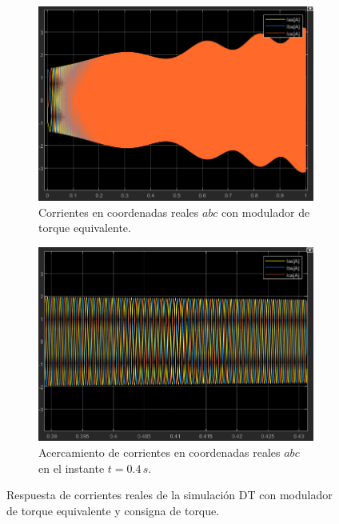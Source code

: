 \documentclass{article}
\begin{document}
\begin{figure}[H]
    \centering
    \begin{subfigure}[t]{0.48\textwidth}
        \centering
        \includegraphics[width=\textwidth]{Imagenes/Curvas_corrientes_modulador_torque.png}
        \caption{Corrientes en coordenadas reales \(abc\) con modulador de torque equivalente.}
        \label{fig:curvas_corrientesABC_modulador_torque}
    \end{subfigure}
    \hfill  %
    \begin{subfigure}[t]{0.48\textwidth}
        \centering
        \includegraphics[width=\textwidth]{Imagenes/Acercamiento_corrientes_modulador_torque.png}
        \caption{Acercamiento de corrientes en coordenadas reales \(abc\) en el instante \(t = 0{.}4\, s\).}
        \label{fig:acercamiento_corrientes_torques_modulador}
    \end{subfigure}
    \caption{Respuesta de corrientes reales de la simulación DT con modulador de torque equivalente y consigna de torque.}
    \label{fig:simulacionDT_modulador_corrientes}
\end{figure}
\end{document}
